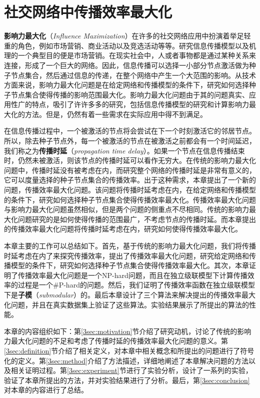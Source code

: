 \chapter{社交网络中传播效率最大化}
\label{3chap:main}
\textbf{影响力最大化}（\textit{Influence Maximization}）在许多的社交网络应用中扮演着举足轻重的角色，例如市场营销、商业活动以及竞选活动等等。研究信息传播模型以及机理的一个典型目的便是市场营销。在现实社会中，人或者事物都是通过某种关系来连接，形成了一个巨大的网络。因此，信息传播可以选择一小部分节点激活做为种子节点集合，然后通过信息的传递，在整个网络中产生一个大范围的影响。从技术方面来说，影响力最大化问题是在给定网络和传播模型的条件下，研究如何选择种子节点集合使得传播的影响范围最大化。影响力最大化问题由于其的问题真实、应用性广的特点，吸引了许许多多的研究，包括信息传播模型的研究和计算影响力最大化的方法。但是，仍然有着一些需求在实际应用中得不到满足。

在信息传播过程中，一个被激活的节点将会尝试在下一个时刻激活它的邻居节点。所以，除去种子节点外，每一个被激活的节点在被激活之前都会有一个时间延迟，我们称之为\textbf{传播时延}（\textit{propagation time delay}）。如果一个节点在信息传播结束时，仍然未被激活，则该节点的传播时延可以看作无穷大。在传统的影响力最大化问题中，传播时延没有被考虑在内，而研究整个网络的传播时延是非常有意义的，它可以度量选择的种子节点集合的传播效率。出于这种需求，本章提出了一个新的问题，传播效率最大化问题。该问题将传播时延考虑在内，在给定网络和传播模型的条件下，研究如何选择种子节点集合使得传播效率最大化。传播效率最大化问题与影响力最大化问题虽然相似，但是两个问题的侧重点不尽相同。传统的影响力最大化问题研究的是如何使得传播的范围最广，不考虑节点的传播时延。而本章提出的传播效率最大化问题将传播时延考虑在内，研究如何使得传播效率最大化。

本章主要的工作可以总结如下。首先，基于传统的影响力最大化问题，我们将传播时延考虑在内了来探究传播效率，提出了传播效率最大化问题，研究给定网络和传播模型的条件下，研究如何选择种子节点集合使得传播效率最大化。其次，本章证明了传播效率最大化问题是一个NP-hard问题，而且在独立级联模型下计算传播效率的过程是一个\#P-hard的问题。然后，我们证明了传播效率函数在独立级联模型下是\textbf{子模}（\textit{submodular}）的。最后本章设计了三个算法来解决提出的传播效率最大化问题，并且在真实数据集上验证了这些算法。实验结果展示了所提出的算法的性能。

本章的内容组织如下：第\ref{3sec:motivation}节介绍了研究动机，讨论了传统的影响力最大化问题的不足和考虑了传播时延的传播效率最大化问题的意义。第\ref{3sec:definition}节介绍了相关定义，对本章中相关概念和所提出的问题进行了符号化的定义。第\ref{3sec:method}介绍了方法描述，详细地阐述了本章解决问题的方法以及相关证明过程。第\ref{3sec:experiment}节进行了实验分析，设计了一系列的实验，验证了本章所提出的方法，并对实验结果进行了分析。最后，第\ref{3sec:conclusion}对本章的内容进行了总结。

